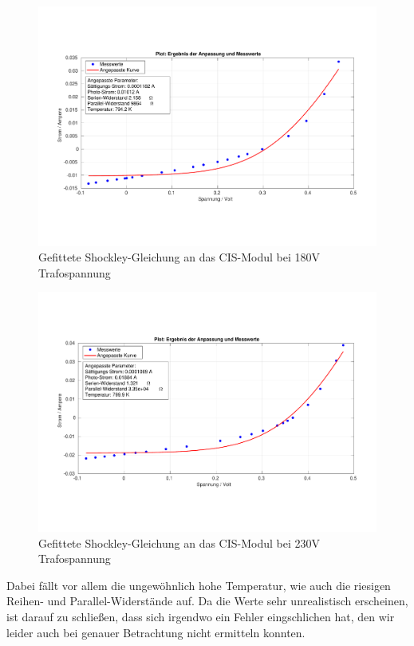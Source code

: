 \begin{figure}[ht]
    \centering
    \includegraphics[width = \linewidth]{Bilder/CIS180Plot.pdf}
    \caption{Gefittete Shockley-Gleichung an das CIS-Modul bei 180V Trafospannung}    
\end{figure}

\begin{figure}[ht]
    \centering
    \includegraphics[width = \linewidth]{Bilder/CIS230Plot.pdf}
    \caption{Gefittete Shockley-Gleichung an das CIS-Modul bei 230V Trafospannung}
\end{figure}

Dabei fällt vor allem die ungewöhnlich hohe Temperatur, wie auch die riesigen Reihen- und Parallel-Widerstände auf. 
Da die Werte sehr unrealistisch erscheinen, ist darauf zu schließen, dass sich irgendwo ein Fehler eingschlichen hat, 
den wir leider auch bei genauer Betrachtung nicht ermitteln konnten.

